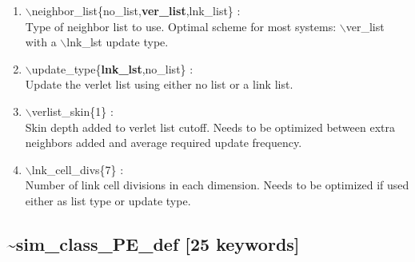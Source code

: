 \documentclass[12pt,titlepage]{article}
\begin{document}
\begin{enumerate}

 \vspace{0.15in} 
 \item   $\backslash$neighbor\_list\{no\_list,{\bf ver\_list},lnk\_list\} : \\
   Type of neighbor list to use.  Optimal scheme for most systems: 
   $\backslash$ver\_list with a $\backslash$lnk\_lst update type.

 \vspace{0.15in} 
 \item   $\backslash$update\_type\{{\bf lnk\_lst},no\_list\} : \\
   Update the verlet list using either no list or a link list.

 \vspace{0.15in} 
 \item   $\backslash$verlist\_skin\{1\} : \\
   Skin depth added to verlet list cutoff.  Needs to be optimized between
   extra neighbors added and average required update frequency.

 \vspace{0.15in} 
 \item   $\backslash$lnk\_cell\_divs\{7\} : \\
   Number of link cell divisions in each dimension.  Needs to be optimized
   if used either as list type or update type.

\end{enumerate}

\newpage
\subsection*{\bf \~{}sim\_class\_PE\_def [25 keywords]}
\end{document}
